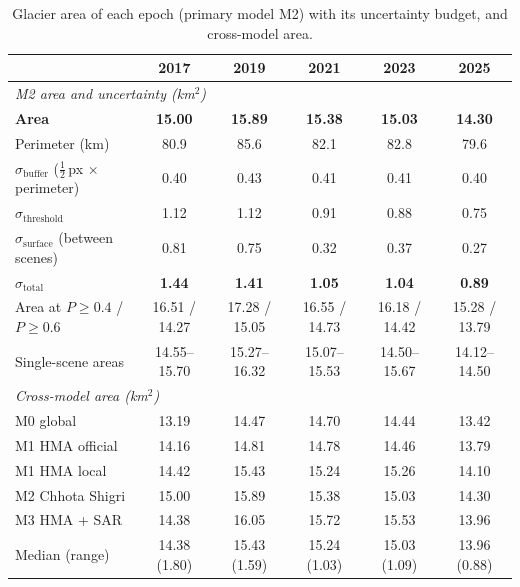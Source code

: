 \documentclass[10pt]{article}
\newcommand{\kmsq}{km$^2$}
\begin{document}
\begin{table}[p]
\centering\footnotesize
\setlength{\tabcolsep}{5pt}
\begin{threeparttable}
\caption{Glacier area of each epoch (primary model M2) with its uncertainty budget, and
cross-model area.}
\label{tab:epoch_area}
\begin{tabular}{l ccccc}
\toprule
 & \textbf{2017} & \textbf{2019} & \textbf{2021} & \textbf{2023} & \textbf{2025} \\
\midrule
\multicolumn{6}{l}{\textit{M2 area and uncertainty (\kmsq)}} \\
\textbf{Area}                        & \textbf{15.00} & \textbf{15.89} & \textbf{15.38} & \textbf{15.03} & \textbf{14.30} \\
Perimeter (km)                       & 80.9 & 85.6 & 82.1 & 82.8 & 79.6 \\
$\sigma_\mathrm{buffer}$ ($\tfrac12$\,px $\times$ perimeter) & 0.40 & 0.43 & 0.41 & 0.41 & 0.40 \\
$\sigma_\mathrm{threshold}$          & 1.12 & 1.12 & 0.91 & 0.88 & 0.75 \\
$\sigma_\mathrm{surface}$ (between scenes) & 0.81 & 0.75 & 0.32 & 0.37 & 0.27 \\
\textbf{$\sigma_\mathrm{total}$}     & \textbf{1.44} & \textbf{1.41} & \textbf{1.05} & \textbf{1.04} & \textbf{0.89} \\
Area at $P \ge 0.4$ / $P \ge 0.6$    & 16.51 / 14.27 & 17.28 / 15.05 & 16.55 / 14.73 & 16.18 / 14.42 & 15.28 / 13.79 \\
Single-scene areas                   & 14.55--15.70 & 15.27--16.32 & 15.07--15.53 & 14.50--15.67 & 14.12--14.50 \\
\midrule
\multicolumn{6}{l}{\textit{Cross-model area (\kmsq)}} \\
M0 global                            & 13.19 & 14.47 & 14.70 & 14.44 & 13.42 \\
M1 HMA official                      & 14.16 & 14.81 & 14.78 & 14.46 & 13.79 \\
M1 HMA local                         & 14.42 & 15.43 & 15.24 & 15.26 & 14.10 \\
M2 Chhota Shigri                     & 15.00 & 15.89 & 15.38 & 15.03 & 14.30 \\
M3 HMA + SAR                         & 14.38 & 16.05 & 15.72 & 15.53 & 13.96 \\
Median (range)                       & 14.38 (1.80) & 15.43 (1.59) & 15.24 (1.03) & 15.03 (1.09) & 13.96 (0.88) \\

\end{tabular}
\end{threeparttable}
\end{table}
\end{document}
